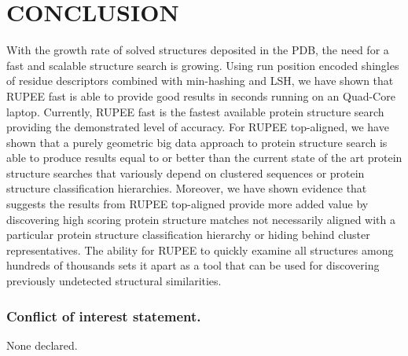 \documentclass[letter,center,fleqn]{NAR}
\begin{document}
\section{CONCLUSION}

With the growth rate of solved structures deposited in the PDB, the need for a fast and scalable structure search is growing. 
Using run position encoded shingles of residue descriptors combined with min-hashing and LSH, we have shown that RUPEE fast is able to provide good results in seconds running on an Quad-Core laptop.
Currently, RUPEE fast is the fastest available protein structure search providing the demonstrated level of accuracy. 
For RUPEE top-aligned, we have shown that a purely geometric big data approach to protein structure search is able to produce results equal to or better than the current state of the art protein structure searches that variously depend on clustered sequences or protein structure classification hierarchies. 
Moreover, we have shown evidence that suggests the results from RUPEE top-aligned provide more added value by discovering high scoring protein structure matches not necessarily aligned with a particular protein structure classification hierarchy or hiding behind cluster representatives. 
The ability for RUPEE to quickly examine all structures among hundreds of thousands sets it apart as a tool that can be used for discovering previously undetected structural similarities.

\subsubsection{Conflict of interest statement.} None declared.
\newpage

\nocite{Ayoub2017}
\nocite{BioJava2012}


\end{document}

